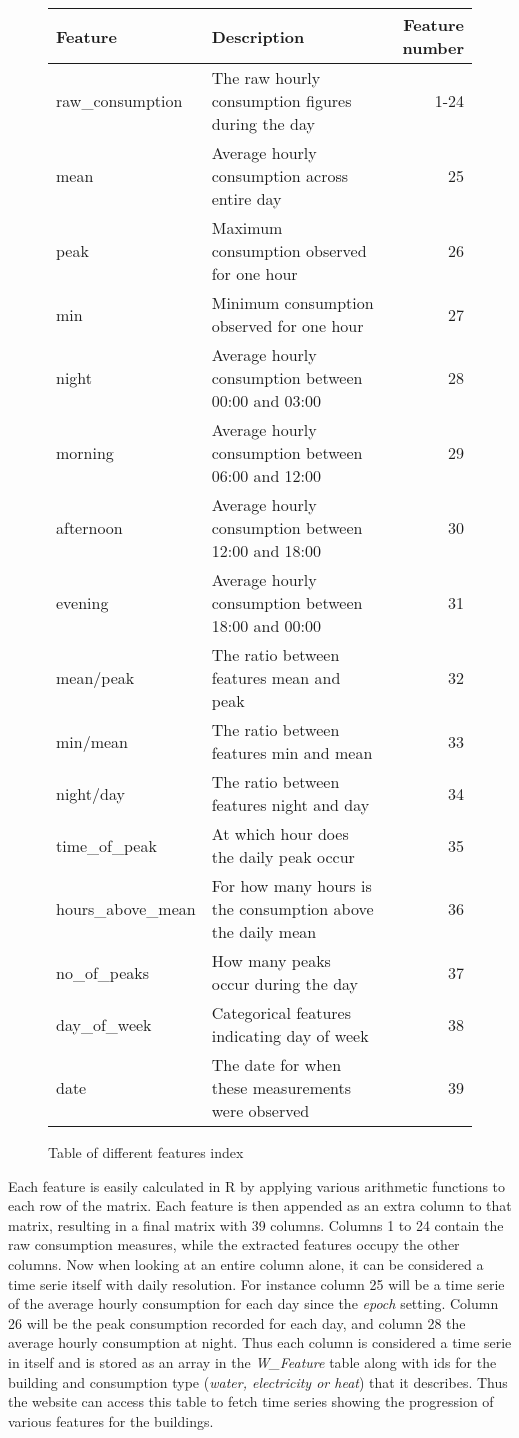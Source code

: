 \begin{figure}
\begin{center}
\begin{tabular}{|l | l | r |}
\hline
Feature & Description & Feature number \\ \hline
raw\_consumption & The raw hourly consumption figures during the day & 1-24 \\ \hline
mean & Average hourly consumption across entire day & 25 \\ \hline
peak & Maximum consumption observed for one hour&  26\\ \hline
min & Minimum consumption observed for one hour &  27\\ \hline
night & Average hourly consumption between 00:00 and 03:00 & 28 \\ \hline
morning & Average hourly consumption between 06:00 and 12:00 & 29 \\ \hline
afternoon & Average hourly consumption between 12:00 and 18:00 & 30 \\ \hline
evening & Average hourly consumption between 18:00 and 00:00 & 31 \\ \hline
mean/peak & The ratio between features mean and peak & 32\\ \hline
min/mean & The ratio between features min and mean&  33\\ \hline
night/day & The ratio between features night and day&  34\\ \hline
time\_of\_peak & At which hour does the daily peak occur& 35 \\ \hline
hours\_above\_mean & For how many hours is the consumption above the daily mean &  36\\ \hline
no\_of\_peaks & How many peaks occur during the day &  37\\ \hline
day\_of\_week & Categorical features indicating day of week& 38 \\ \hline
date & The date for when these measurements were observed &  39\\
\hline
\end{tabular}
\end{center}
\caption{Table of different features index}
\end{figure}
Each feature is easily calculated in R by applying various arithmetic functions to each row of the matrix. Each feature is then appended as an extra column to that matrix, resulting in a final matrix with 39 columns. Columns 1 to 24 contain the raw consumption measures, while the extracted features occupy the other columns.
Now when looking at an entire column alone, it can be considered a time serie itself with daily resolution. For instance column 25 will be a time serie of the average hourly consumption for each day since the \emph{epoch} setting. Column 26 will be the peak consumption recorded for each day, and column 28 the average hourly consumption at night. Thus each column is considered a time serie in itself and is stored as an array in the \emph{W\_Feature} table along with ids for the building and consumption type (\emph{water, electricity or heat}) that it describes. Thus the website can access this table to fetch time series showing the progression of various features for the buildings.
